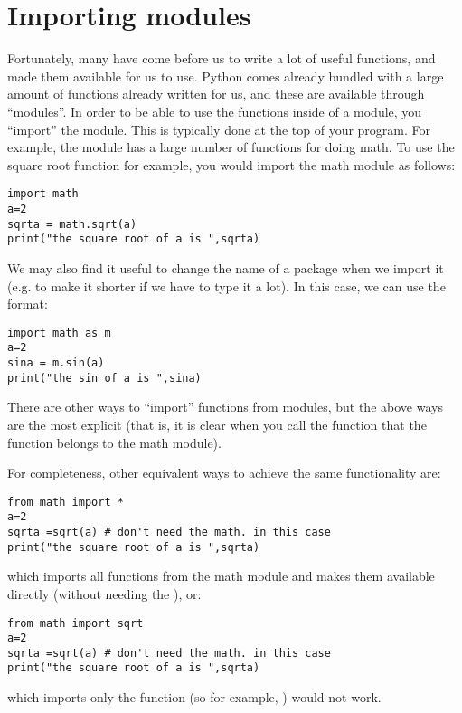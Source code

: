 \section{Importing modules}
Fortunately, many have come before us to write a lot of useful functions, and made them available for us to use. Python comes already bundled with a large amount of functions already written for us, and these are available through ``modules''. In order to be able to use the functions inside of a module, you ``import'' the module. This is typically done at the top of your program. For example, the  module has a large number of functions for doing math. To use the square root function for example, you would import the math module as follows:
\begin{lstlisting}[frame=single] 
import math
a=2
sqrta = math.sqrt(a)
print("the square root of a is ",sqrta)
\end{lstlisting}

We may also find it useful to change the name of a package when we import it (e.g. to make it shorter if we have to type it a lot). In this case, we can use the  format:

\begin{lstlisting}[frame=single] 
import math as m
a=2
sina = m.sin(a)
print("the sin of a is ",sina)
\end{lstlisting}

There are other ways to ``import'' functions from modules, but the above ways are the most explicit (that is, it is clear when you call the function  that the function belongs to the math module).

For completeness, other equivalent ways to achieve the same functionality are:
\begin{lstlisting}[frame=single] 
from math import *
a=2
sqrta =sqrt(a) # don't need the math. in this case
print("the square root of a is ",sqrta)
\end{lstlisting}
which imports all functions from the math module and makes them available directly (without needing the ), or:
\begin{lstlisting}[frame=single] 
from math import sqrt
a=2
sqrta =sqrt(a) # don't need the math. in this case
print("the square root of a is ",sqrta)
\end{lstlisting}
which imports only the  function (so for example, ) would not work.

